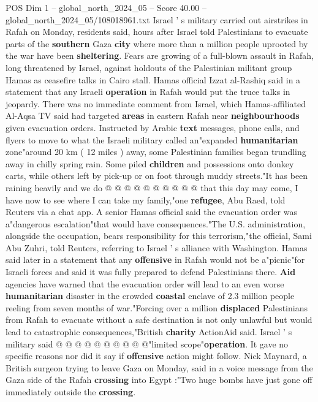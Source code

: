 \begin{textsample}{POS Dim 1 – global\_north\_2024\_05 – Score 40.00 – global\_north\_2024\_05/108018961.txt}  \label{ex:f1_pos_280}
Israel ' s military carried out airstrikes in Rafah on Monday, residents said, hours after Israel told Palestinians to evacuate parts of the \textbf{southern} Gaza \textbf{city} where more than a million people uprooted by the war have been \textbf{sheltering}.
Fears are growing of a full-blown assault in Rafah, long threatened by Israel, against holdouts of the Palestinian militant group Hamas as ceasefire talks in Cairo stall.
Hamas official Izzat al-Rashiq said in a statement that any Israeli \textbf{operation} in Rafah would put the truce talks in jeopardy.
There was no immediate comment from Israel, which Hamas-affiliated Al-Aqsa TV said had targeted \textbf{areas} in eastern Rafah near \textbf{neighbourhoods} given evacuation orders.
Instructed by Arabic \textbf{text} messages, phone calls, and flyers to move to what the Israeli military called an"expanded \textbf{humanitarian} zone"around 20 km ( 12 miles ) away, some Palestinian families began trundling away in chilly spring rain.
Some piled \textbf{children} and possessions onto donkey carts, while others left by pick-up or on foot through muddy streets."It has been raining heavily and we do @ @ @ @ @ @ @ @ @ @ that this day may come, I have now to see where I can take my family,"one \textbf{refugee}, Abu Raed, told Reuters via a chat app.
A senior Hamas official said the evacuation order was a"dangerous escalation"that would have consequences."The U.S. administration, alongside the occupation, bears responsibility for this terrorism,"the official, Sami Abu Zuhri, told Reuters, referring to Israel ' s alliance with Washington.
Hamas said later in a statement that any \textbf{offensive} in Rafah would not be a"picnic"for Israeli forces and said it was fully prepared to defend Palestinians there. \textbf{Aid} agencies have warned that the evacuation order will lead to an even worse \textbf{humanitarian} disaster in the crowded \textbf{coastal} enclave of 2.3 million people reeling from seven months of war."Forcing over a million \textbf{displaced} Palestinians from Rafah to evacuate without a safe destination is not only unlawful but would lead to catastrophic consequences,"British \textbf{charity} ActionAid said.
Israel ' s military said @ @ @ @ @ @ @ @ @ @"limited scope"\textbf{operation}.
It gave no specific reasons nor did it say if \textbf{offensive} action might follow.
Nick Maynard, a British surgeon trying to leave Gaza on Monday, said in a voice message from the Gaza side of the Rafah \textbf{crossing} into Egypt :"Two huge bombs have just gone off immediately outside the \textbf{crossing}.

\end{textsample}
